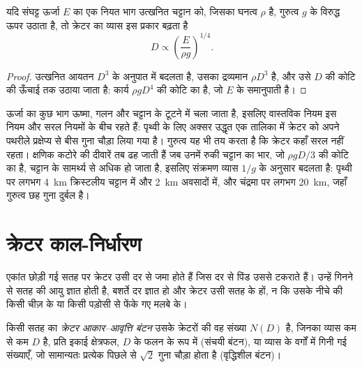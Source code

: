 \begin{proposition}[गुरुत्व-शासन का मापन]\label{prop:b3:planetary-interiors-surfaces:scaling}
यदि संघट्ट ऊर्जा $E$ का एक नियत भाग उत्खनित चट्टान को, जिसका घनत्व $\rho$ है,
गुरुत्व $g$ के विरुद्ध ऊपर उठाता है, तो क्रेटर का व्यास इस प्रकार बढ़ता है
\[
  D \propto \left(\frac{E}{\rho g}\right)^{1/4} .
\]
\end{proposition}

\begin{proof}
उत्खनित आयतन $D^3$ के अनुपात में बदलता है, उसका द्रव्यमान $\rho D^3$ है, और
उसे $D$ की कोटि की ऊँचाई तक उठाया जाता है: कार्य $\rho g D^4$ की कोटि का है, जो
$E$ के समानुपाती है।
\end{proof}

ऊर्जा का कुछ भाग ऊष्मा, गलन और चट्टान के टूटने में चला जाता है, इसलिए
वास्तविक नियम इस नियम और सरल नियमों के बीच रहते हैं: पृथ्वी के लिए अक्सर उद्धृत एक तालिका में
क्रेटर को अपने पथरीले
प्रक्षेप्य से बीस गुना चौड़ा लिया गया है। गुरुत्व यह भी तय करता है कि क्रेटर कहाँ सरल नहीं रहता।
क्षणिक कटोरे की दीवारें तब ढह जाती हैं जब उनमें रुकी चट्टान का भार,
जो $\rho g D/3$ की कोटि का है, चट्टान के सामर्थ्य से अधिक हो जाता है, इसलिए
संक्रमण व्यास $1/g$ के अनुसार बदलता है: पृथ्वी पर लगभग \qty{4}{km} क्रिस्टलीय
चट्टान में और \qty{2}{km} अवसादों में, और चंद्रमा पर लगभग \qty{20}{km}, जहाँ
गुरुत्व छह गुना दुर्बल है।

\section{क्रेटर काल-निर्धारण}\label{sec:b3:planetary-interiors-surfaces:dating}

एकांत छोड़ी गई सतह पर क्रेटर उसी दर से जमा होते हैं जिस दर से पिंड
उससे टकराते हैं। उन्हें गिनने से सतह की आयु ज्ञात होती है, बशर्ते दर ज्ञात हो और
क्रेटर उसी सतह के हों, न कि उसके नीचे की किसी चीज़ के या
किसी पड़ोसी से फेंके गए मलबे के।

\begin{definition}[क्रेटर आकार--आवृत्ति बंटन]\label{def:b3:planetary-interiors-surfaces:sfd}
किसी सतह का \emph{क्रेटर आकार--आवृत्ति बंटन}
उसके क्रेटरों की वह संख्या $N(D)$ है, जिनका व्यास कम से कम $D$ है, प्रति
इकाई क्षेत्रफल, $D$ के फलन के रूप में (संचयी बंटन), या
व्यास के वर्गों में गिनी गई संख्याएँ, जो सामान्यतः प्रत्येक
पिछले से $\sqrt2$ गुना चौड़ा होता है (वृद्धिशील बंटन)।
\end{definition}

